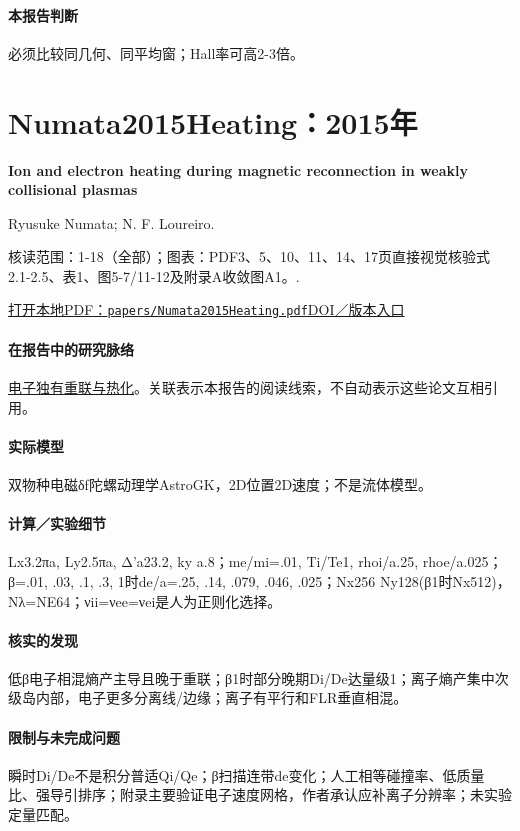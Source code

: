 \paragraph{本报告判断}必须比较同几何、同平均窗；Hall率可高2-3倍。

\section{Numata2015Heating：2015年}\label{paper:Numata2015Heating}

\textbf{Ion and electron heating during magnetic reconnection in weakly collisional plasmas}\citep{Numata2015Heating}\

Ryusuke Numata;  N. F. Loureiro.

\textsf{核读范围：}1-18（全部）；\textsf{图表：}PDF3、5、10、11、14、17页直接视觉核验式2.1-2.5、表1、图5-7/11-12及附录A收敛图A1。.

\href{run:papers/Numata2015Heating.pdf}{打开本地PDF：\texttt{papers/Numata2015Heating.pdf}}\quad\href{https://doi.org/10.1017/S002237781400107X}{DOI／版本入口}

\paragraph{在报告中的研究脉络}\hyperref[story:energy]{电子独有重联与热化}。关联表示本报告的阅读线索，不自动表示这些论文互相引用。

\paragraph{实际模型}双物种电磁δf陀螺动理学AstroGK，2D位置2D速度；不是流体模型。

\paragraph{计算／实验细节}Lx3.2πa, Ly2.5πa, Δ'a23.2, ky a.8；me/mi=.01, Ti/Te1, rhoi/a.25, rhoe/a.025；β=.01, .03, .1, .3, 1时de/a=.25, .14, .079, .046, .025；Nx256 Ny128(β1时Nx512)，Nλ=NE64；νii=νee=νei是人为正则化选择。

\paragraph{核实的发现}低β电子相混熵产主导且晚于重联；β1时部分晚期Di/De达量级1；离子熵产集中次级岛内部，电子更多分离线/边缘；离子有平行和FLR垂直相混。

\paragraph{限制与未完成问题}瞬时Di/De不是积分普适Qi/Qe；β扫描连带de变化；人工相等碰撞率、低质量比、强导引排序；附录主要验证电子速度网格，作者承认应补离子分辨率；未实验定量匹配。

